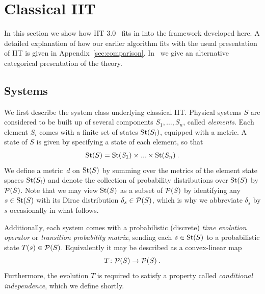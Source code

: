 \section{Classical IIT}\label{sec:Classical}

In this section we show how IIT 3.0~\cite{mayner2018pyphi,marshall2016integrated,tononi.2015.scholarpedia,oizumi2014phenomenology} fits in into the framework 
developed here. A detailed explanation of how our earlier algorithm fits with the usual presentation of IIT is given in Appendix~\ref{sec:comparison}. In~\cite{IITProcess} we give an alternative categorical presentation of the theory. 

\subsection{Systems}\label{sec:ClassicalSysDef} We first describe the system class underlying classical IIT. Physical systems $S$ are considered to be built up of several components  $S_1, \dots, S_n$, called \emph{elements}.
Each element $S_i$ comes with a finite set of states $\text{St}(S_i)$, equipped with a metric. A state of $S$ is given by specifying a state of each element, so that
\begin{equation}\label{eq:CSt}
\text{St}(S) = \text{St}(S_1) \times ... \times \text{St}(S_n) \:.
\end{equation}
We define a metric~$d$ on $\text{St}(S)$ by summing over the metrics of the element state spaces $\text{St}(S_i)$ and denote the collection of probability distributions over $\text{St}(S)$ by $\mathcal P(S)$. Note that we may view $\text{St}(S)$ as a subset of $\mathcal P(S)$ by identifying any $s \in \text{St}(S)$ with its Dirac distribution $\delta_s \in \mathcal P(S)$, which is why we abbreviate $\delta_s$ by $s$ occasionally in what follows.

Additionally, each system comes with a probabilistic (discrete) \emph{time evolution operator} or \emph{transition probability matrix}, sending each $s \in \text{St}(S)$ to a probabilistic state $T(s) \in \mathcal P(S)$. Equivalently it may be described as a convex-linear map 
\begin{equation}\label{eq:SysTPM}
T \colon \mathcal P(S) \to \mathcal P(S)  \:.
\end{equation}
Furthermore, the evolution $T$ is required to satisfy a property called \emph{conditional independence}, which we define shortly. 

